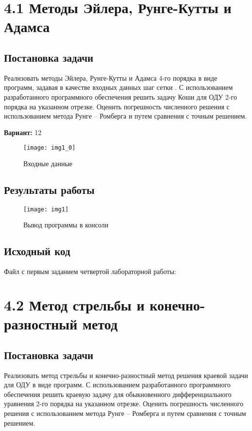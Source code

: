 \section* {4.1 Методы Эйлера, Рунге-Кутты и Адамса}

\subsection{Постановка задачи}
Реализовать методы Эйлера, Рунге-Кутты и Адамса 4-го порядка в виде программ, задавая в качестве входных данных шаг сетки  . С использованием разработанного программного обеспечения решить задачу Коши для ОДУ 2-го порядка на указанном отрезке. Оценить погрешность численного решения с использованием метода Рунге – Ромберга и путем сравнения с точным решением. 

{\bfseries Вариант:} 12

\begin{figure}[h!]
\centering
\texttt{[image: img1\_0]}
\caption{Входные данные}
\end{figure}

\subsection{Результаты работы}
\begin{figure}[h!]
\centering
\texttt{[image: img1]}
\caption{Вывод программы в консоли}
\end{figure}

\pagebreak

\subsection{Исходный код}
Файл с первым заданием четвертой лабораторной работы:

\pagebreak

\section* {4.2 Метод стрельбы и конечно-разностный метод}

\subsection{Постановка задачи}
Реализовать метод стрельбы и конечно-разностный метод решения краевой задачи для ОДУ в виде программ. С использованием разработанного программного обеспечения решить краевую задачу для обыкновенного дифференциального уравнения 2-го порядка на указанном отрезке. Оценить погрешность численного решения с использованием метода Рунге – Ромберга и путем сравнения с точным решением. 


